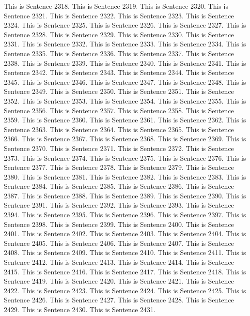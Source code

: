 \documentclass{article}
\begin{document}
This is Sentence 2318.
This is Sentence 2319.
This is Sentence 2320.
This is Sentence 2321.
This is Sentence 2322.
This is Sentence 2323.
This is Sentence 2324.
This is Sentence 2325.
This is Sentence 2326.
This is Sentence 2327.
This is Sentence 2328.
This is Sentence 2329.
This is Sentence 2330.
This is Sentence 2331.
This is Sentence 2332.
This is Sentence 2333.
This is Sentence 2334.
This is Sentence 2335.
This is Sentence 2336.
This is Sentence 2337.
This is Sentence 2338.
This is Sentence 2339.
This is Sentence 2340.
This is Sentence 2341.
This is Sentence 2342.
This is Sentence 2343.
This is Sentence 2344.
This is Sentence 2345.
This is Sentence 2346.
This is Sentence 2347.
This is Sentence 2348.
This is Sentence 2349.
This is Sentence 2350.
This is Sentence 2351.
This is Sentence 2352.
This is Sentence 2353.
This is Sentence 2354.
This is Sentence 2355.
This is Sentence 2356.
This is Sentence 2357.
This is Sentence 2358.
This is Sentence 2359.
This is Sentence 2360.
This is Sentence 2361.
This is Sentence 2362.
This is Sentence 2363.
This is Sentence 2364.
This is Sentence 2365.
This is Sentence 2366.
This is Sentence 2367.
This is Sentence 2368.
This is Sentence 2369.
This is Sentence 2370.
This is Sentence 2371.
This is Sentence 2372.
This is Sentence 2373.
This is Sentence 2374.
This is Sentence 2375.
This is Sentence 2376.
This is Sentence 2377.
This is Sentence 2378.
This is Sentence 2379.
This is Sentence 2380.
This is Sentence 2381.
This is Sentence 2382.
This is Sentence 2383.
This is Sentence 2384.
This is Sentence 2385.
This is Sentence 2386.
This is Sentence 2387.
This is Sentence 2388.
This is Sentence 2389.
This is Sentence 2390.
This is Sentence 2391.
This is Sentence 2392.
This is Sentence 2393.
This is Sentence 2394.
This is Sentence 2395.
This is Sentence 2396.
This is Sentence 2397.
This is Sentence 2398.
This is Sentence 2399.
This is Sentence 2400.
This is Sentence 2401.
This is Sentence 2402.
This is Sentence 2403.
This is Sentence 2404.
This is Sentence 2405.
This is Sentence 2406.
This is Sentence 2407.
This is Sentence 2408.
This is Sentence 2409.
This is Sentence 2410.
This is Sentence 2411.
This is Sentence 2412.
This is Sentence 2413.
This is Sentence 2414.
This is Sentence 2415.
This is Sentence 2416.
This is Sentence 2417.
This is Sentence 2418.
This is Sentence 2419.
This is Sentence 2420.
This is Sentence 2421.
This is Sentence 2422.
This is Sentence 2423.
This is Sentence 2424.
This is Sentence 2425.
This is Sentence 2426.
This is Sentence 2427.
This is Sentence 2428.
This is Sentence 2429.
This is Sentence 2430.
This is Sentence 2431.
\end{document}
